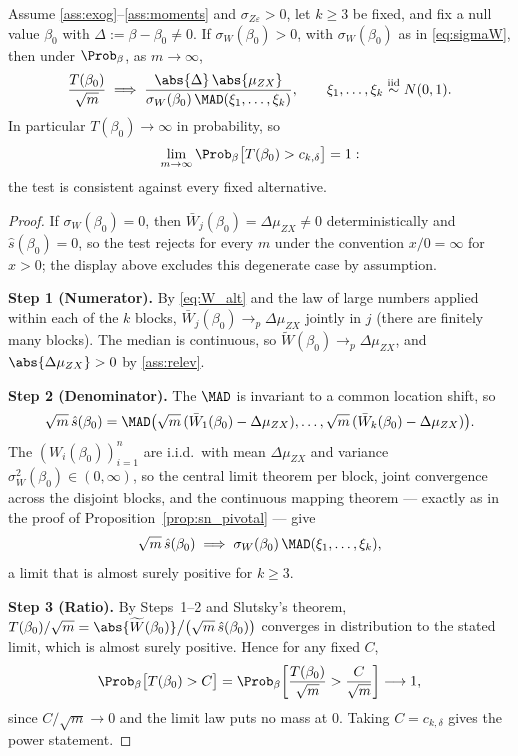\begin{proposition}
\label{prop:sn_consistency}
Assume \ref{ass:exog}--\ref{ass:moments} and $\sigma_{Z\varepsilon} > 0$, let $k \ge 3$ be fixed, and fix a null value $\beta_0$ with $\Delta := \beta - \beta_0 \neq 0$. If $\sigma_W(\beta_0) > 0$, with $\sigma_W(\beta_0)$ as in \eqref{eq:sigmaW}, then under $\Prob_\beta$, as $m\to\infty$,
\[
  \frac{T(\beta_0)}{\sqrt{m}} \;\Longrightarrow\; \frac{\abs{\Delta}\,\abs{\mu_{ZX}}}{\sigma_W(\beta_0)\,\MAD(\xi_1,\dots,\xi_k)},
  \qquad \xi_1,\dots,\xi_k \overset{\text{iid}}{\sim} N(0,1).
\]
In particular $T(\beta_0) \to \infty$ in probability, so
\[
  \lim_{m\to\infty}\Prob_\beta\bigl[T(\beta_0) > c_{k,\delta}\bigr] = 1:
\]
the test is consistent against every fixed alternative.
\end{proposition}

\begin{proof}
If $\sigma_W(\beta_0) = 0$, then $\bar{W}_j(\beta_0) = \Delta\mu_{ZX} \neq 0$ deterministically and $\hat{s}(\beta_0) = 0$, so the test rejects for every $m$ under the convention $x/0 = \infty$ for $x > 0$; the display above excludes this degenerate case by assumption.

\medskip\noindent\textbf{Step 1 (Numerator).} By \eqref{eq:W_alt} and the law of large numbers applied within each of the $k$ blocks, $\bar{W}_j(\beta_0) \to_p \Delta\mu_{ZX}$ jointly in $j$ (there are finitely many blocks). The median is continuous, so $\widetilde{W}(\beta_0) \to_p \Delta\mu_{ZX}$, and $\abs{\Delta\mu_{ZX}} > 0$ by \ref{ass:relev}.

\medskip\noindent\textbf{Step 2 (Denominator).} The $\MAD$ is invariant to a common location shift, so
\[
  \sqrt{m}\,\hat{s}(\beta_0)
  = \MAD\bigl(\sqrt{m}\,(\bar{W}_1(\beta_0) - \Delta\mu_{ZX}),\dots,\sqrt{m}\,(\bar{W}_k(\beta_0) - \Delta\mu_{ZX})\bigr).
\]
The $(W_i(\beta_0))_{i=1}^{n}$ are i.i.d.\ with mean $\Delta\mu_{ZX}$ and variance $\sigma_W^2(\beta_0) \in (0,\infty)$, so the central limit theorem per block, joint convergence across the disjoint blocks, and the continuous mapping theorem --- exactly as in the proof of Proposition~\ref{prop:sn_pivotal} --- give
\[
  \sqrt{m}\,\hat{s}(\beta_0) \;\Longrightarrow\; \sigma_W(\beta_0)\,\MAD(\xi_1,\dots,\xi_k),
\]
a limit that is almost surely positive for $k \ge 3$.

\medskip\noindent\textbf{Step 3 (Ratio).} By Steps~1--2 and Slutsky's theorem, $T(\beta_0)/\sqrt{m} = \abs{\widetilde{W}(\beta_0)}\big/\bigl(\sqrt{m}\,\hat{s}(\beta_0)\bigr)$ converges in distribution to the stated limit, which is almost surely positive. Hence for any fixed $C$,
\[
  \Prob_\beta\bigl[T(\beta_0) > C\bigr] = \Prob_\beta\!\left[\frac{T(\beta_0)}{\sqrt{m}} > \frac{C}{\sqrt{m}}\right] \longrightarrow 1,
\]
since $C/\sqrt{m} \to 0$ and the limit law puts no mass at $0$. Taking $C = c_{k,\delta}$ gives the power statement.
\end{proof}

